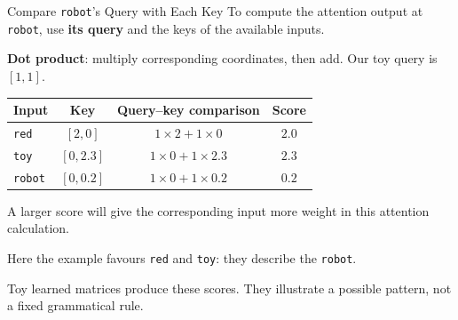 \documentclass[aspectratio=169]{beamer}
\begin{document}
\begin{frame}{Compare \texttt{robot}'s Query with Each Key}
  \small To compute the attention output at \texttt{robot}, use \textbf{its query} and the keys of the available inputs.
  \par\vspace{0.3em}
  \textbf{Dot product}: multiply corresponding coordinates, then add. Our toy query is $[1,1]$.
  \begin{center}
  {\small\renewcommand{\arraystretch}{1.6}
  \begin{tabular}{@{}lccc@{}}
    \toprule
    \textbf{Input} & \textbf{Key} & \textbf{Query--key comparison} & \textbf{Score} \\
    \midrule
    \texttt{red} & $[2,0]$ & $1\times2+1\times0$ & $2.0$ \\
    \texttt{toy} & $[0,2.3]$ & $1\times0+1\times2.3$ & $2.3$ \\
    \texttt{robot} & $[0,0.2]$ & $1\times0+1\times0.2$ & $0.2$ \\
    \bottomrule
  \end{tabular}}
  \end{center}
  \small A larger score will give the corresponding input more weight in this attention calculation.
  \par\vspace{0.3em}
  Here the example favours \texttt{red} and \texttt{toy}: they describe the \texttt{robot}.
  \par\vspace{0.3em}
  {\scriptsize Toy learned matrices produce these scores. They illustrate a possible pattern, not a fixed grammatical rule.}
\end{frame}
\end{document}

